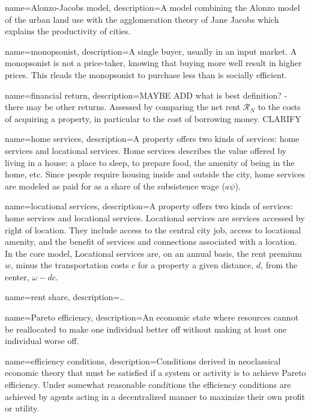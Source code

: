 {
name=Alonzo-Jacobs model,
description={A model combining the \gls{Alonzo model} of the urban land use  \cite{alonsoModelUrbanLand1960} with the \gls{agglomeration} theory of Jane Jacobs \cite{jacobsEconomyCities1969} which explains the productivity of cities.}
}

{
name=monopsonist,
description={A single buyer, usually in an input market. A monopsonist is not a price-taker, knowing that buying more well result in  higher prices. This rleads the monopsonist to purchase less than is socially efficient.}
}

{
name=financial return,
description={MAYBE ADD what is best definition? - there may be other returns. Assessed by comparing the net rent $\mathcal{R}_N$ to the costs of acquiring a property, in particular to the cost of borrowing money. CLARIFY}
}

{
name=home services,
description={A property offers two kinds of services: home services and \gls{locational services}. Home services describes the value offered by living in a house: a place to sleep, to prepare food, the amenity of being in the home, etc. Since people require housing inside and outside the city, home services are modeled as paid for as a share of the subsistence wage ($a \psi$).}
}

{
name=locational services,
description={A property offers two kinds of services: \gls{home services} and locational services. Locational services are services accessed by right of location. They include access to the central city job, access to locational amenity, and the benefit of services and connections associated with a location. In the core model, Locational services are, on an annual basis, the rent premium $w$, minus the transportation costs $c$ for a property a given distance, $d$, from the center, $\omega- {dc}$.}
}

{
name=rent share,
description={..}
}

{
name=Pareto efficiency,
description={An economic state where resources cannot be reallocated to make one individual better off without making at least one individual worse off.}
}

{
name=efficiency conditions,
description={Conditions derived in neoclassical economic theory that must be satisfied if a system or activity is to achieve Pareto efficiency. Under somewhat reasonable conditions the efficiency conditions are achieved by agents acting in a decentralized manner to maximize their own profit or utility.}
}

